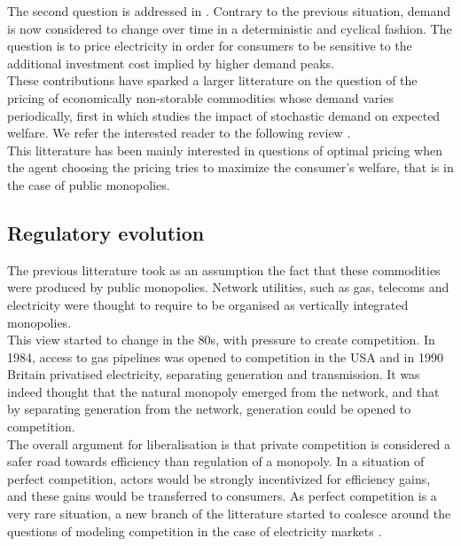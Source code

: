 The second question is addressed in \cite{boiteux1960peak}. Contrary to the previous situation, demand is now considered to change over time in a deterministic and cyclical fashion. The question is to price electricity in order for consumers to be sensitive to the additional investment cost implied by higher demand peaks. \\

These contributions have sparked a larger litterature on the question of the pricing of economically non-storable commodities whose demand varies periodically, first in \cite{brown1969public} which studies the impact of stochastic demand on expected welfare. We refer the interested reader to the following review \cite{crew1995theory}. \\ 

This litterature has been mainly interested in questions of optimal pricing when the agent choosing the pricing tries to maximize the consumer's welfare, that is in the case of public monopolies. \\

\subsection*{Regulatory evolution}
The previous litterature took as an assumption the fact that these commodities were produced by public monopolies. Network utilities, such as gas, telecoms and electricity were thought to require to be organised as vertically integrated monopolies. \\

This view started to change in the 80s, with pressure to create competition. In 1984, access to gas pipelines was opened to competition in the USA and in 1990 Britain privatised electricity, separating generation and transmission. It was indeed thought that the natural monopoly emerged from the network, and that by separating generation from the network, generation could be opened to competition. \\

The overall argument for liberalisation is that private competition is considered a safer road towards efficiency than regulation of a monopoly. In a situation of perfect competition, actors would be strongly incentivized for efficiency gains, and these gains would be transferred to consumers. As perfect competition is a very rare situation, a new branch of the litterature started to coalesce around the questions of modeling competition in the case of electricity markets \cite{newbery1997privatisation}. \\

